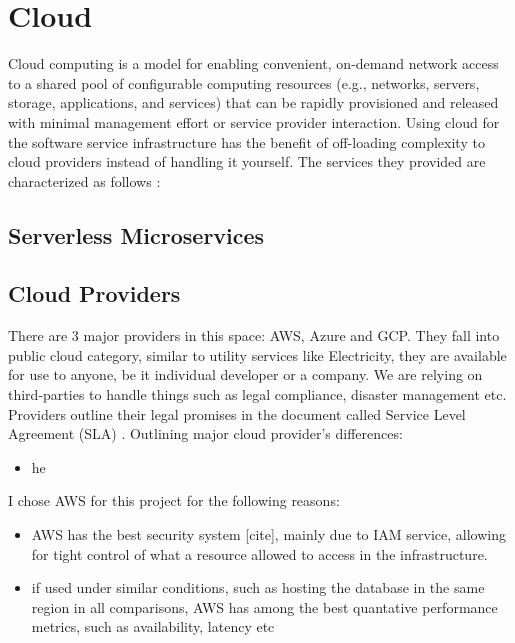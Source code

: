 \section{Cloud}
Cloud computing is a model for enabling convenient, on-demand network access to a shared pool of configurable computing
resources (e.g., networks, servers, storage, applications, and services) that can be rapidly provisioned and released with minimal
management effort or service provider interaction. \cite {cloudDef}
Using cloud for the software service infrastructure has the benefit of off-loading complexity to cloud providers instead of handling it yourself. The services they provided are characterized as follows \cite{cloudServicesCategories}: 
\subsection{Serverless Microservices}
\subsection{Cloud Providers}
There are 3 major providers in this space: AWS, Azure and GCP. They fall into public cloud category, similar to utility services like Electricity, they are available for use to anyone, be it individual developer or a company. We are relying on third-parties to handle things such as legal compliance, disaster management etc. Providers outline their legal promises in the document called Service Level Agreement (SLA) \cite{cloudSLA}. Outlining major cloud provider's differences:
\begin{itemize}
    \item {he}
\end{itemize}

I chose AWS for this project for the following reasons:
\begin{itemize}
    \item{AWS has the best security system [cite], mainly due to IAM service, allowing for tight control of what a resource allowed to access in the infrastructure. }
    \item{if used under similar conditions, such as hosting the database in the same region in all comparisons, AWS has among the best quantative performance metrics, such as availability, latency etc \cite{CloudMetrics}  }
\end{itemize}
